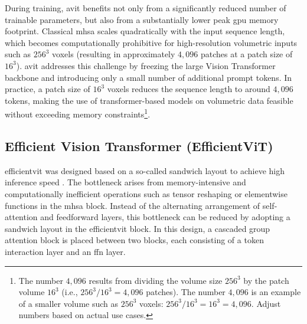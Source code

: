 \medskip

During training, \gls{avit} benefits not only from a significantly reduced number of trainable parameters, but also from a substantially lower peak \gls{gpu} memory footprint. Classical \gls{mhsa} scales quadratically with the input sequence length, which becomes computationally prohibitive for high-resolution volumetric inputs such as $256^{3}$ voxels (resulting in approximately $4{,}096$ patches at a patch size of $16^{3}$). \gls{avit} addresses this challenge by freezing the large Vision Transformer backbone and introducing only a small number of additional prompt tokens. In practice, a patch size of $16^3$ voxels reduces the sequence length to around $4{,}096$ tokens, making the use of transformer-based models on volumetric data feasible without exceeding memory constraints\footnote{The number $4{,}096$ results from dividing the volume size $256^3$ by the patch volume $16^3$ (i.e., $256^3 / 16^3 = 4,096$ patches). The number $4{,}096$ is an example of a smaller volume such as $256^3$ voxels: $256^3 / 16^3 = 16^3 = 4{,}096$. Adjust numbers based on actual use cases.}. 



\subsection{Efficient Vision Transformer (EfficientViT)}
\gls{efficientvit} was designed based on a so-called sandwich layout to achieve high inference speed \cite{liu2023efficientvitmemoryefficientvision}. The bottleneck arises from memory-intensive and computationally inefficient operations such as tensor reshaping or elementwise functions in the \gls{mhsa} block. Instead of the alternating arrangement of self-attention and feedforward layers, this bottleneck can be reduced by adopting a sandwich layout in the \gls{efficientvit} block. In this design, a cascaded group attention block is placed between two blocks, each consisting of a token interaction layer and an \gls{ffn} layer. 

\medskip


